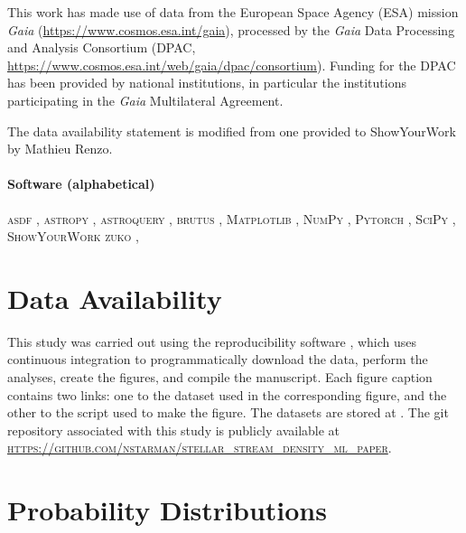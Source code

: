 \documentclass[twocolumn]{aastex631}
\newcommand{\code}[1]{\textsc{#1}}
\newcommand{\package}[1]{\code{#1}}
\newcommand{\dataarchive}[1]{\textit{#1}}
\newcommand{\Gaia}{\dataarchive{Gaia}}
\begin{document}
    This work has made use of data from the European Space Agency (ESA) mission
    \Gaia{} (\url{https://www.cosmos.esa.int/gaia}), processed by the \Gaia{}
    Data Processing and Analysis Consortium (DPAC,
    \url{https://www.cosmos.esa.int/web/gaia/dpac/consortium}). Funding for the
    DPAC has been provided by national institutions, in particular the
    institutions participating in the \Gaia{} Multilateral Agreement.

    The data availability statement is modified from one provided to
    ShowYourWork by Mathieu Renzo.

    \paragraph{Software (alphabetical)}

        \package{asdf} \citep{Greenfield+2015}, %
        \package{astropy} \citep{Astropy2013, Astropy2018, Astropy2022}, %
        \package{astroquery} \citep{Astroquery2019}, %
        \package{brutus} \citep{brutus}, %
        \package{Matplotlib} \citep{Hunter2007}, %
        \package{NumPy} \citep{Harris+2020}, %
        \package{Pytorch} \citep{Pytorch2019}, %
        \package{SciPy} \citep{Scipy2020}, %
        \package{ShowYourWork} \citep{Luger+2021} %
        \package{zuko} \citep{zuko}, %


\section*{Data Availability} \label{sec:data_availability}

    This study was carried out using the reproducibility software
    \href{https://github.com/showyourwork/showyourwork}{\showyourwork}
    \citep{Luger+2021}, which uses continuous integration to programmatically
    download the data, perform the analyses, create the figures, and compile the
    manuscript. Each figure caption contains two links: one to the dataset used
    in the corresponding figure, and the other to the script used to make the
    figure. The datasets are stored at . The git
    repository associated with this study is publicly available at
    \package{\url{https://github.com/nstarman/stellar_stream_density_ml_paper}}.





\appendix

\section{Probability Distributions} \label{app:distributions}
\end{document}
